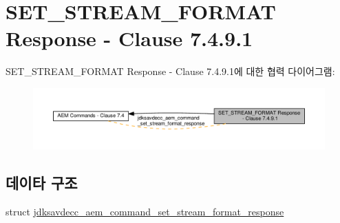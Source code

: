 \hypertarget{group__command__set__stream__format__response}{}\section{S\+E\+T\+\_\+\+S\+T\+R\+E\+A\+M\+\_\+\+F\+O\+R\+M\+AT Response -\/ Clause 7.4.9.1}
\label{group__command__set__stream__format__response}
S\+E\+T\+\_\+\+S\+T\+R\+E\+A\+M\+\_\+\+F\+O\+R\+M\+AT Response -\/ Clause 7.4.9.1에 대한 협력 다이어그램\+:
\nopagebreak
\begin{figure}[H]
\begin{center}
\leavevmode
\includegraphics[width=350pt]{group__command__set__stream__format__response}
\end{center}
\end{figure}
\subsection*{데이타 구조}
\begin{DoxyCompactItemize}
\item 
struct \hyperlink{structjdksavdecc__aem__command__set__stream__format__response}{jdksavdecc\+\_\+aem\+\_\+command\+\_\+set\+\_\+stream\+\_\+format\+\_\+response}
\end{DoxyCompactItemize}
